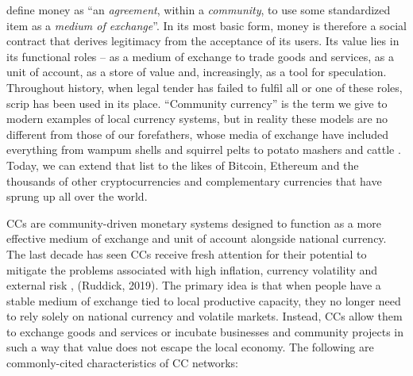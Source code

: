\documentclass[12pt]{article}
\begin{document}
\cite{lietaer2011new} define money as “an \textit{agreement}, within a \textit{community}, to use some standardized item as a \textit{medium of exchange}”. In its most basic form, money is therefore a social contract that derives legitimacy from the acceptance of its users. Its value lies in its functional roles – as a medium of exchange to trade goods and services, as a unit of account, as a store of value and, increasingly, as a tool for speculation. Throughout history, when legal tender has failed to fulfil all or one of these roles, scrip has been used in its place. “Community currency” is the term we give to modern examples of local currency systems, but in reality these models are no different from those of our forefathers, whose media of exchange have included everything from wampum shells and squirrel pelts to potato mashers and cattle \citep{davies2008regional}. Today, we can extend that list to the likes of Bitcoin, Ethereum and the thousands of other cryptocurrencies and complementary currencies that have sprung up all over the world.

CCs are community-driven monetary systems designed to function as a more effective medium of exchange and unit of account alongside national currency. The last decade has seen CCs receive fresh attention for their potential to mitigate the problems associated with high inflation, currency volatility and external risk \citep{Castilla-Rubio2016Fintech,stodder2016macro}, (Ruddick, 2019). The primary idea is that when people have a stable medium of exchange tied to local productive capacity, they no longer need to rely solely on national currency and volatile markets. Instead, CCs allow them to exchange goods and services or incubate businesses and community projects in such a way that value does not escape the local economy. The following are commonly-cited characteristics of CC networks:
\end{document}
